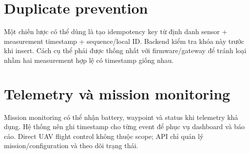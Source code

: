 \section{Duplicate prevention}
Một chiến lược có thể dùng là tạo idempotency key từ định danh sensor + measurement timestamp + sequence/local ID. Backend kiểm tra khóa này trước khi insert. Cách cụ thể phải được thống nhất với firmware/gateway để tránh loại nhầm hai measurement hợp lệ có timestamp giống nhau.

\section{Telemetry và mission monitoring}
Mission monitoring có thể nhận battery, waypoint và status khi telemetry khả dụng. Hệ thống nên ghi timestamp cho từng event để phục vụ dashboard và báo cáo. Direct UAV flight control không thuộc scope; API chỉ quản lý mission/configuration và theo dõi trạng thái.

